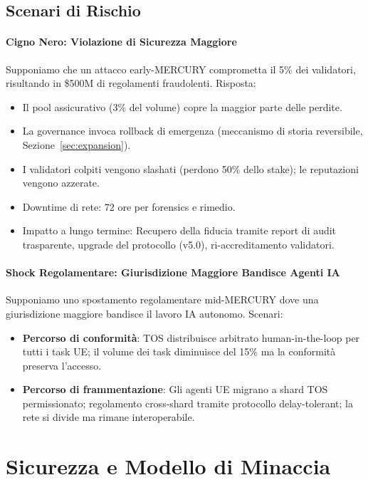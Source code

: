\documentclass[11pt]{article}
\begin{document}
\begin{itemize}[noitemsep]
\subsection{Scenari di Rischio}
\paragraph{Cigno Nero: Violazione di Sicurezza Maggiore}
Supponiamo che un attacco early-MERCURY comprometta il 5\% dei validatori, risultando in \$500M di regolamenti fraudolenti. Risposta:
\begin{itemize}[noitemsep]
  \item Il pool assicurativo (3\% del volume) copre la maggior parte delle perdite.
  \item La governance invoca rollback di emergenza (meccanismo di storia reversibile, Sezione~\ref{sec:expansion}).
  \item I validatori colpiti vengono slashati (perdono 50\% dello stake); le reputazioni vengono azzerate.
  \item Downtime di rete: 72 ore per forensics e rimedio.
  \item Impatto a lungo termine: Recupero della fiducia tramite report di audit trasparente, upgrade del protocollo (v5.0), ri-accreditamento validatori.
\end{itemize}

\paragraph{Shock Regolamentare: Giurisdizione Maggiore Bandisce Agenti IA}
Supponiamo uno spostamento regolamentare mid-MERCURY dove una giurisdizione maggiore bandisce il lavoro IA autonomo. Scenari:
\begin{itemize}[noitemsep]
  \item \textbf{Percorso di conformità}: TOS distribuisce arbitrato human-in-the-loop per tutti i task UE; il volume dei task diminuisce del 15\% ma la conformità preserva l'accesso.
  \item \textbf{Percorso di frammentazione}: Gli agenti UE migrano a shard TOS permissionato; regolamento cross-shard tramite protocollo delay-tolerant; la rete si divide ma rimane interoperabile.
\end{itemize}

\section{Sicurezza e Modello di Minaccia}
\label{sec:security}


\end{itemize}
\end{document}
